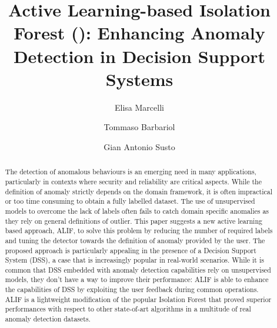 \documentclass[preprint,10pt,a4paper]{elsarticle}
\title{Active Learning-based Isolation Forest (\approach): Enhancing Anomaly Detection in Decision Support Systems}
\author[inst1]{Elisa Marcelli}
\author[inst1]{Tommaso Barbariol}
\author[inst1,inst2]{Gian Antonio Susto}
\newcommand{\tommi}[1]{\textcolor{blue}{#1}}
\newcommand{\elisa}[1]{\textcolor{red}{#1}}
\newcommand{\gas}[1]{\textcolor{green}{#1}}
\newcommand{\approach}{ALIF\xspace}
\begin{document}
\begin{abstract} %
The detection of anomalous behaviours is an emerging need in many applications, particularly in contexts where security and reliability are critical aspects. While the definition of anomaly strictly depends on the domain framework, it is often impractical or too time consuming to obtain a fully labelled dataset. The use of unsupervised models to overcome the lack of labels often fails to catch domain specific anomalies as they rely on general definitions of outlier. This paper suggests a new active learning based approach, \approach, to solve this problem by reducing the number of required labels and tuning the detector towards the definition of anomaly provided by the user.
The proposed approach is particularly appealing in the presence of a Decision Support System (DSS), a case that is increasingly popular in real-world scenarios. While it is common that DSS embedded with anomaly detection capabilities rely on unsupervised models, they don't have a way to improve their performance: \approach is able to enhance the capabilities of DSS by exploiting the user feedback during common operations. %
\approach is a lightweight modification of the popular Isolation Forest that proved superior performances %
with respect to other state-of-art algorithms in a multitude of real anomaly detection datasets. 


\end{abstract}
\end{document}
